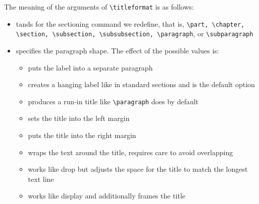 The meaning of the arguments of \lstinline|\titleformat| is as follows:
\begin{itemize}
\item {} tands for the sectioning command we redefine, that is, \lstinline|\part, \chapter, \section, \subsection, \subsubsection, \paragraph|, or \lstinline|\subparagraph|
\item {} specifies the paragraph shape. The effect of the possible values is:
  \begin{itemize}
  \item {} puts the label into a separate paragraph
  \item {} creates a hanging label like in standard sections and is the default option
  \item {} produces a run-in title like \lstinline|\paragraph| does by default
  \item {} sets the title into the left margin
  \item {} puts the title into the right margin
  \item {} wraps the text around the title, requires care to avoid overlapping
  \item {} works like drop but adjusts the space for the title to match the longest text line
  \item {} works like display and additionally frames the title

\end{itemize}
\end{itemize}
